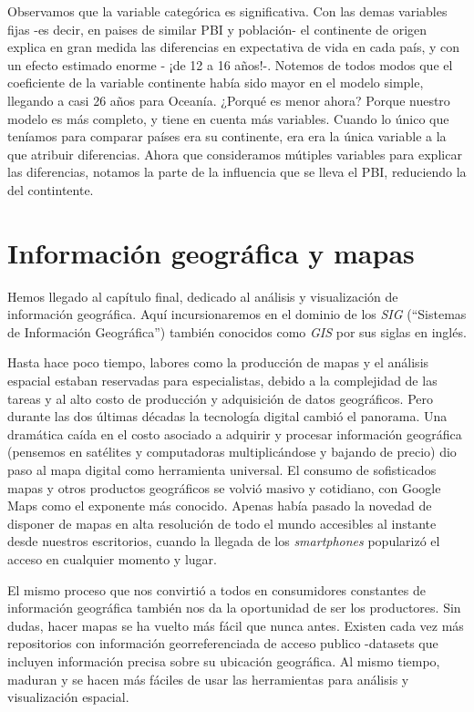 \documentclass[spanish,]{book}
\begin{document}
Observamos que la variable categórica es significativa. Con las demas variables fijas -es decir, en paises de similar PBI y población- el continente de origen explica en gran medida las diferencias en expectativa de vida en cada país, y con un efecto estimado enorme - ¡de 12 a 16 años!-. Notemos de todos modos que el coeficiente de la variable continente había sido mayor en el modelo simple, llegando a casi 26 años para Oceanía. ¿Porqué es menor ahora? Porque nuestro modelo es más completo, y tiene en cuenta más variables. Cuando lo único que teníamos para comparar países era su continente, era era la única variable a la que atribuir diferencias. Ahora que consideramos mútiples variables para explicar las diferencias, notamos la parte de la influencia que se lleva el PBI, reduciendo la del contintente.

\hypertarget{informacion-geografica-y-mapas}{%
\chapter{Información geográfica y mapas}\label{informacion-geografica-y-mapas}}

Hemos llegado al capítulo final, dedicado al análisis y visualización de información geográfica. Aquí incursionaremos en el dominio de los \emph{SIG} (``Sistemas de Información Geográfica'') también conocidos como \emph{GIS} por sus siglas en inglés.

Hasta hace poco tiempo, labores como la producción de mapas y el análisis espacial estaban reservadas para especialistas, debido a la complejidad de las tareas y al alto costo de producción y adquisición de datos geográficos. Pero durante las dos últimas décadas la tecnología digital cambió el panorama. Una dramática caída en el costo asociado a adquirir y procesar información geográfica (pensemos en satélites y computadoras multiplicándose y bajando de precio) dio paso al mapa digital como herramienta universal. El consumo de sofisticados mapas y otros productos geográficos se volvió masivo y cotidiano, con Google Maps como el exponente más conocido. Apenas había pasado la novedad de disponer de mapas en alta resolución de todo el mundo accesibles al instante desde nuestros escritorios, cuando la llegada de los \emph{smartphones} popularizó el acceso en cualquier momento y lugar.

El mismo proceso que nos convirtió a todos en consumidores constantes de información geográfica también nos da la oportunidad de ser los productores. Sin dudas, hacer mapas se ha vuelto más fácil que nunca antes. Existen cada vez más repositorios con información georreferenciada de acceso publico -datasets que incluyen información precisa sobre su ubicación geográfica. Al mismo tiempo, maduran y se hacen más fáciles de usar las herramientas para análisis y visualización espacial.
\end{document}
